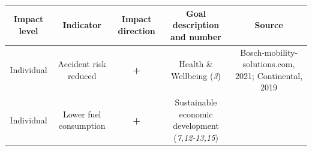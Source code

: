 \documentclass[
]{book}
\begin{document}
\begin{longtable}[]{@{}ccccc@{}}
\toprule
\begin{minipage}[b]{0.17\columnwidth}\centering
Impact level\strut
\end{minipage} & \begin{minipage}[b]{0.16\columnwidth}\centering
Indicator\strut
\end{minipage} & \begin{minipage}[b]{0.17\columnwidth}\centering
Impact direction\strut
\end{minipage} & \begin{minipage}[b]{0.17\columnwidth}\centering
Goal description and number\strut
\end{minipage} & \begin{minipage}[b]{0.17\columnwidth}\centering
Source\strut
\end{minipage}\tabularnewline
\midrule
\endhead
\begin{minipage}[t]{0.17\columnwidth}\centering
Individual\strut
\end{minipage} & \begin{minipage}[t]{0.16\columnwidth}\centering
Accident risk reduced\strut
\end{minipage} & \begin{minipage}[t]{0.17\columnwidth}\centering
\textbf{+}\strut
\end{minipage} & \begin{minipage}[t]{0.17\columnwidth}\centering
Health \& Wellbeing (\emph{3})\strut
\end{minipage} & \begin{minipage}[t]{0.17\columnwidth}\centering
Bosch-mobility-solutions.com, 2021; Continental, 2019\strut
\end{minipage}\tabularnewline
\begin{minipage}[t]{0.17\columnwidth}\centering
Individual\strut
\end{minipage} & \begin{minipage}[t]{0.16\columnwidth}\centering
Lower fuel consumption\strut
\end{minipage} & \begin{minipage}[t]{0.17\columnwidth}\centering
\textbf{+}\strut
\end{minipage} & \begin{minipage}[t]{0.17\columnwidth}\centering
Sustainable economic development (\emph{7,12-13,15})\strut
\end{minipage} & \begin{minipage}[t]{0.17\columnwidth}\centering

\end{minipage}
\end{longtable}
\end{document}
